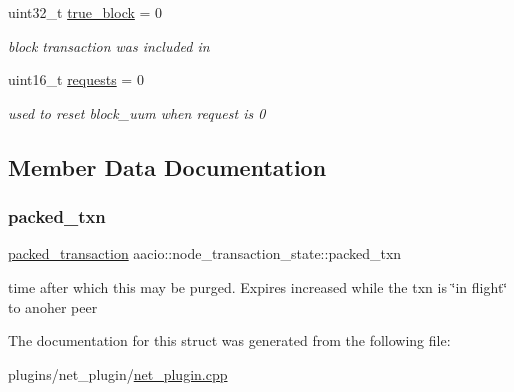 \begin{DoxyCompactItemize}
uint32\+\_\+t \mbox{\hyperlink{structaacio_1_1node__transaction__state_ac8f765ac503ac09999d4386b2c6b9b8b}{true\+\_\+block}} = 0
\begin{DoxyCompactList}\small\item\em block transaction was included in \end{DoxyCompactList}\item 
\mbox{\label{structaacio_1_1node__transaction__state_a7f1a1de713e75c46ae76fc96e9264805}} 
uint16\+\_\+t \mbox{\hyperlink{structaacio_1_1node__transaction__state_a7f1a1de713e75c46ae76fc96e9264805}{requests}} = 0
\begin{DoxyCompactList}\small\item\em used to reset block\+\_\+uum when request is 0 \end{DoxyCompactList}\end{DoxyCompactItemize}


\subsection{Member Data Documentation}
\mbox{\label{structaacio_1_1node__transaction__state_a4d51156ad0895003949f8e7e8c7c7231}} 
\subsubsection{\texorpdfstring{packed\+\_\+txn}{packed\_txn}}
{\footnotesize\ttfamily \mbox{\hyperlink{structaacio_1_1chain_1_1packed__transaction}{packed\+\_\+transaction}} aacio\+::node\+\_\+transaction\+\_\+state\+::packed\+\_\+txn}

time after which this may be purged. Expires increased while the txn is \char`\"{}in flight\char`\"{} to anoher peer 

The documentation for this struct was generated from the following file\+:\begin{DoxyCompactItemize}
\item 
plugins/net\+\_\+plugin/\mbox{\hyperlink{net__plugin_8cpp}{net\+\_\+plugin.\+cpp}}\end{DoxyCompactItemize}
